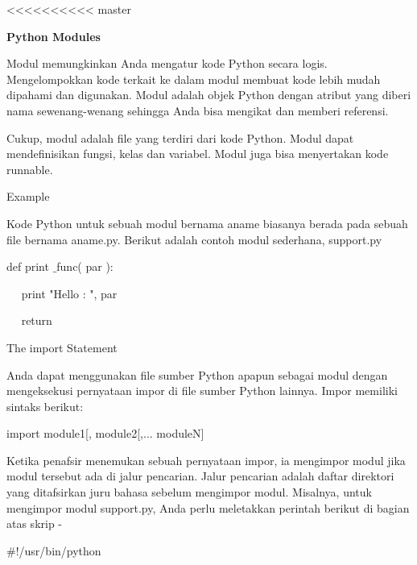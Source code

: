 <<<<<<<<<< master
\sloppy
\begin{center}{\fontsize{16pt}{16pt}\selectfont \textbf{Python Modules} \\}\end{center} \par
\vspace{12pt}
\noindent 
Modul memungkinkan Anda mengatur kode Python secara logis. Mengelompokkan kode terkait ke dalam modul membuat kode lebih mudah dipahami dan digunakan. Modul adalah objek Python dengan atribut yang diberi nama sewenang-wenang sehingga Anda bisa mengikat dan memberi referensi. \par
\noindent 
Cukup, modul adalah file yang terdiri dari kode Python. Modul dapat mendefinisikan fungsi, kelas dan variabel. Modul juga bisa menyertakan kode runnable. \par
\vspace{12pt}
\noindent 
Example \par
\noindent 
Kode Python untuk sebuah modul bernama aname biasanya berada pada sebuah file bernama aname.py. Berikut adalah contoh modul sederhana, support.py \par
\noindent 
 \hspace*{0.5in} def print $  \_  $func( par ): \par
\noindent 
 \hspace*{0.5in} ~~ print "Hello : ", par \par
\noindent 
 \hspace*{0.5in} ~~ return \par
\vspace{12pt}
\noindent 
The $  $import $  $Statement \par
\noindent 
Anda dapat menggunakan file sumber Python apapun sebagai modul dengan mengeksekusi pernyataan impor di file sumber Python lainnya. Impor memiliki sintaks berikut: \par
\noindent 
 \hspace*{0.5in} import module1[, module2[,... moduleN] \par
\noindent 
Ketika penafsir menemukan sebuah pernyataan impor, ia mengimpor modul jika modul tersebut ada di jalur pencarian. Jalur pencarian adalah daftar direktori yang ditafsirkan juru bahasa sebelum mengimpor modul. Misalnya, untuk mengimpor modul support.py, Anda perlu meletakkan perintah berikut di bagian atas skrip - \par
\noindent 
 \hspace*{0.5in}  $  \#  $!/usr/bin/python \par

